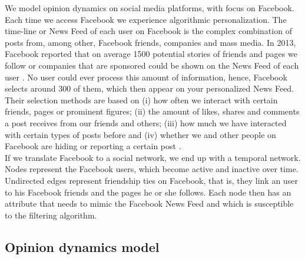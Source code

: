 \documentclass[11 pt , letterpaper , twoside , openright]{book}
\begin{document}
We model opinion dynamics on social media platforms, with focus on Facebook. Each time we access Facebook we experience algorithmic personalization. The time-line or News Feed of each user on Facebook is the complex combination of posts from, among other, Facebook friends, companies and mass media. In 2013, Facebook reported that on average 1500 potential stories of friends and pages we follow or companies that are sponsored could be shown on the News Feed of each user \cite{facebook}. No user could ever process this amount of information, hence, Facebook selects around 300 of them, which then appear on your personalized News Feed. Their selection methods are based on (i) how often we interact with certain friends, pages or prominent figures; (ii) the amount of likes, shares and comments a post receives from our friends and others; (iii) how much we have interacted with certain types of posts before and (iv) whether we and other people on Facebook are hiding or reporting a certain post \cite{facebook}. \\
\newline
If we translate Facebook to a social network, we end up with a temporal network. Nodes represent the Facebook users, which become active and inactive over time. Undirected edges represent friendship ties on Facebook, that is, they link an user to his Facebook friends and the pages he or she follows. Each node then has an attribute that needs to mimic the Facebook News Feed and which is susceptible to the filtering algorithm.

\subsection{Opinion dynamics model}
\end{document}
